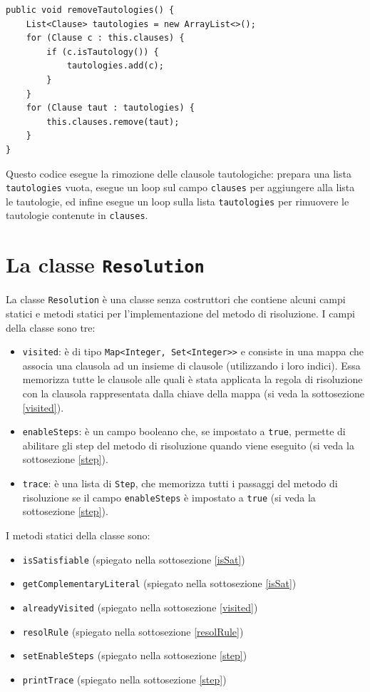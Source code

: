\documentclass[a4paper,12pt]{report}
\begin{document}
\begin{minipage}{\linewidth}
\small
\begin{lstlisting}[caption={Metodo \texttt{removeTautologies} della classe \texttt{ClauseSet}}, label={method:removeTautologies}]
public void removeTautologies() {
    List<Clause> tautologies = new ArrayList<>();
    for (Clause c : this.clauses) {
        if (c.isTautology()) {
            tautologies.add(c);
        }
    }
    for (Clause taut : tautologies) {
        this.clauses.remove(taut);
    }
}
\end{lstlisting}
\end{minipage}
Questo codice esegue la rimozione delle clausole tautologiche: prepara una lista \texttt{tautologies} vuota, esegue un loop sul campo \texttt{clauses} per aggiungere alla lista le tautologie, ed infine esegue un loop sulla lista \texttt{tautologies} per rimuovere le tautologie contenute in \texttt{clauses}.

\section{La classe \texttt{Resolution}}
\label{class:Resolution}
La classe \texttt{Resolution} è una classe senza costruttori che contiene alcuni campi statici e metodi statici per l'implementazione del metodo di risoluzione. I campi della classe sono tre:
\begin{itemize}
    \item \texttt{visited}: è di tipo \texttt{Map<Integer, Set<Integer>>} e consiste in una mappa che associa una clausola ad un insieme di clausole (utilizzando i loro indici). Essa memorizza tutte le clausole alle quali è stata applicata la regola di risoluzione con la clausola rappresentata dalla chiave della mappa (si veda la sottosezione \ref{visited}).
    \item \texttt{enableSteps}: è un campo booleano che, se impostato a \texttt{true}, permette di abilitare gli step del metodo di risoluzione quando viene eseguito (si veda la sottosezione \ref{step}).
    \item \texttt{trace}: è una lista di \texttt{Step}, che memorizza tutti i passaggi del metodo di risoluzione se il campo \texttt{enableSteps} è impostato a \texttt{true} (si veda la sottosezione \ref{step}).
\end{itemize}

I metodi statici della classe sono:
\begin{itemize}
    \item \texttt{isSatisfiable} (spiegato nella sottosezione \ref{isSat})
    \item \texttt{getComplementaryLiteral} (spiegato nella sottosezione \ref{isSat})
    \item \texttt{alreadyVisited} (spiegato nella sottosezione \ref{visited})
    \item \texttt{resolRule} (spiegato nella sottosezione \ref{resolRule})
    \item \texttt{setEnableSteps} (spiegato nella sottosezione \ref{step})
    \item \texttt{printTrace} (spiegato nella sottosezione \ref{step})
\end{itemize}
\end{document}
